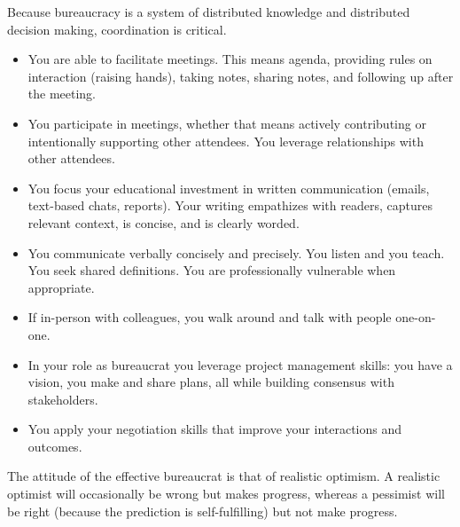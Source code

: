 Because bureaucracy is a system of distributed knowledge and distributed decision making, coordination is critical. 
\begin{itemize}
    \item You are able to facilitate meetings. This means agenda, providing rules on interaction (raising hands), taking notes, sharing notes, and following up after the meeting.
    \item You participate in meetings, whether that means actively contributing or intentionally supporting other attendees. You leverage relationships with other attendees. 
    \item You focus your educational investment in written communication (emails, text-based chats, reports). Your writing empathizes with readers, captures relevant context, is concise, and is clearly worded.
    \item You communicate verbally concisely and precisely. You listen and you teach. You seek shared definitions. You are professionally vulnerable when appropriate. 
    \item If in-person with colleagues, you walk around and talk with people one-on-one.  
    \item In your role as bureaucrat you leverage project management skills: you have a vision, you make and share plans, all while building consensus with stakeholders.
    \item You apply your negotiation skills \cite{1982_Cohen} that improve your interactions and outcomes.
\end{itemize}

The attitude of the effective bureaucrat  is that of realistic optimism. A realistic optimist will occasionally be wrong but makes progress, whereas a pessimist will be right (because the prediction is self-fulfilling) but not make progress.
